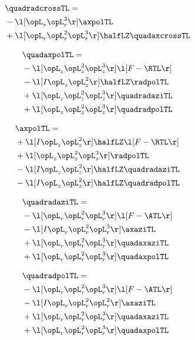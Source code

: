 \begin{alignat}{2} 
\label{eq:quadradcrossTL_0} 
& \quadradcrossTL = \\ 
& - \l[ \opL_r \opL_r^{2}  \r] \axpolTL \nonumber \\ 
& + \l[ \opL_r \opL_r^{2} \opL_r^{3}  \r] \halfLZ \quadaxcrossTL \nonumber \\ 
\end{alignat} 


\begin{alignat}{2} 
\label{eq:quadaxpolTL_0} 
& \quadaxpolTL = \\ 
& - \l[ \opL_z \opL_z^{2} \opL_z^{3}  \r] \l[ F - \RTL \r] \nonumber \\ 
& - \l[ I \opL_z \opL_z^{2}  \r] \halfLZ \radpolTL \nonumber \\ 
& + \l[ \opL_z \opL_z^{2} \opL_z^{3}  \r] \quadradaziTL \nonumber \\ 
& + \l[ \opL_z \opL_z^{2} \opL_z^{3}  \r] \quadradpolTL \nonumber \\ 
\end{alignat} 


\begin{alignat}{2} 
\label{eq:linaxpolTL_0} 
& \axpolTL = \\ 
& + \l[ I \opL_z \opL_z^{2}  \r] \halfLZ \l[ F - \RTL \r] \nonumber \\ 
& + \l[ \opL_z \opL_z^{2} \opL_z^{3}  \r] \radpolTL \nonumber \\ 
& - \l[ I \opL_z \opL_z^{2}  \r] \halfLZ \quadradaziTL \nonumber \\ 
& - \l[ I \opL_z \opL_z^{2}  \r] \halfLZ \quadradpolTL \nonumber \\ 
\end{alignat} 


\begin{alignat}{2} 
\label{eq:quadradaziTL_0} 
& \quadradaziTL = \\ 
& - \l[ \opL_r \opL_r^{2} \opL_r^{3}  \r] \l[ F - \ATL \r] \nonumber \\ 
& - \l[ I \opL_r \opL_r^{2} \opL_r^{3}  \r] \axaziTL \nonumber \\ 
& + \l[ \opL_r \opL_r^{2} \opL_r^{3}  \r] \quadaxaziTL \nonumber \\ 
& + \l[ \opL_r \opL_r^{2} \opL_r^{3}  \r] \quadaxpolTL \nonumber \\ 
\end{alignat} 


\begin{alignat}{2} 
\label{eq:quadradpolTL_0} 
& \quadradpolTL = \\ 
& - \l[ \opL_r \opL_r^{2} \opL_r^{3}  \r] \l[ F - \ATL \r] \nonumber \\ 
& - \l[ I \opL_r \opL_r^{2} \opL_r^{2}  \r] \axaziTL \nonumber \\ 
& + \l[ \opL_r \opL_r^{2} \opL_r^{3}  \r] \quadaxaziTL \nonumber \\ 
& + \l[ \opL_r \opL_r^{2} \opL_r^{3}  \r] \quadaxpolTL \nonumber \\ 
\end{alignat} 


